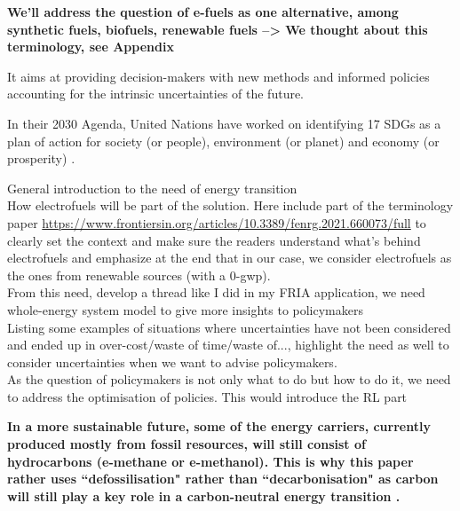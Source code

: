\textbf{We'll address the question of e-fuels as one alternative, among synthetic fuels, biofuels, renewable fuels --> We thought about this terminology, see Appendix}


It aims at providing decision-makers with new methods and informed policies accounting for the intrinsic uncertainties of the future. 




In their 2030 Agenda, United Nations have worked on identifying 17 \gls{SDGs} as a plan of action for society (or people), environment (or planet) and economy (or prosperity) \cite{un_sdgs}. 
%
%

General introduction to the need of energy transition\\

How electrofuels will be part of the solution. Here include part of the terminology paper \url{https://www.frontiersin.org/articles/10.3389/fenrg.2021.660073/full} to clearly set the context and make sure the readers understand what's behind electrofuels and emphasize at the end that in our case, we consider electrofuels as the ones from renewable sources (with a 0-gwp).\\

From this need, develop a thread like I did in my FRIA application, we need whole-energy system model to give more insights to policymakers\\

Listing some examples of situations where uncertainties have not been considered and ended up in over-cost/waste of time/waste of..., highlight the need as well to consider uncertainties when we want to advise policymakers.\\

As the question of policymakers is not only what to do but how to do it, we need to address the optimisation of policies. This would introduce the RL part


\textbf{In a more sustainable future, some of the energy carriers, currently produced mostly from fossil resources, will still consist of hydrocarbons (\eg e-methane or e-methanol). This is why this paper rather uses ``defossilisation" rather than ``decarbonisation" as carbon will still play a key role in a carbon-neutral energy transition \cite{mertens2020carbon}.}



